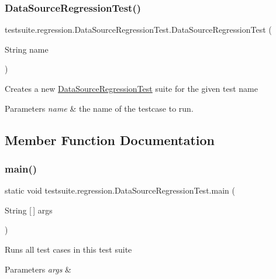 \subsubsection{\texorpdfstring{Data\+Source\+Regression\+Test()}{DataSourceRegressionTest()}}
{\footnotesize\ttfamily testsuite.\+regression.\+Data\+Source\+Regression\+Test.\+Data\+Source\+Regression\+Test (\begin{DoxyParamCaption}\item[{String}]{name }\end{DoxyParamCaption})}

Creates a new \mbox{\hyperlink{classtestsuite_1_1regression_1_1_data_source_regression_test}{Data\+Source\+Regression\+Test}} suite for the given test name


\begin{DoxyParams}{Parameters}
{\em name} & the name of the testcase to run. \\
\hline
\end{DoxyParams}


\subsection{Member Function Documentation}
\mbox{\label{classtestsuite_1_1regression_1_1_data_source_regression_test_a0d381bc3c72a7d395cb47e226208071d}} 
\subsubsection{\texorpdfstring{main()}{main()}}
{\footnotesize\ttfamily static void testsuite.\+regression.\+Data\+Source\+Regression\+Test.\+main (\begin{DoxyParamCaption}\item[{String \mbox{[}$\,$\mbox{]}}]{args }\end{DoxyParamCaption})\hspace{0.3cm}{\ttfamily [static]}}

Runs all test cases in this test suite


\begin{DoxyParams}{Parameters}
{\em args} & \\
\hline
\end{DoxyParams}
\mbox{\label{classtestsuite_1_1regression_1_1_data_source_regression_test_a0f701712ab1a3a10727059063fee1ece}} 
